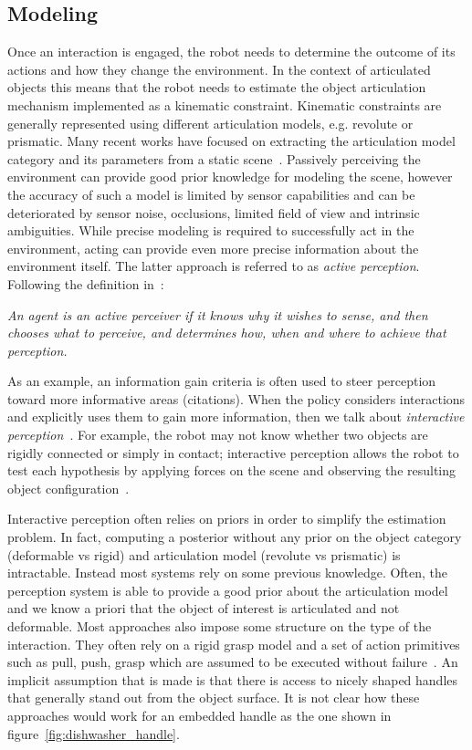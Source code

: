 \subsection{Modeling}
Once an interaction is engaged, the robot needs to determine the outcome of its actions and how they change the environment. In the context of articulated objects this means that the robot needs to estimate the object articulation mechanism implemented as a kinematic constraint. Kinematic constraints are generally represented using different articulation models, e.g. revolute or prismatic. Many recent works have focused on extracting the articulation model category and its parameters from a static scene~\cite{abbatematteo2019learning, li2020category}. 
Passively perceiving the environment can provide good prior knowledge for modeling the scene, however the accuracy of such a model is limited by sensor capabilities and can be deteriorated by sensor noise, occlusions, limited field of view and intrinsic ambiguities. While precise modeling is required to successfully act in the environment, acting can provide even more precise information about the environment itself. The latter approach is referred to as \emph{active perception}. Following the definition in~\cite{bajcsy2018revisiting}:
\begin{displayquote}
\emph{An agent is an active perceiver if it knows why it wishes to sense, and then chooses what to perceive, and determines how, when and where to achieve that perception.}
\end{displayquote}  
As an example, an information gain criteria is often used to steer perception toward more informative areas (citations). When the policy considers interactions and explicitly uses them to gain more information, then we talk about \emph{interactive perception}~\cite{bohg2017interactive, katz2014interactive}. For example, the robot may not know whether two objects are rigidly connected or simply in contact; interactive perception allows the robot to test each hypothesis by applying forces on the scene and observing the resulting object configuration~\citep{kroemer2019review}. 

Interactive perception often relies on priors in order to simplify the estimation problem. In fact, computing a posterior without any prior on the object category (deformable vs rigid) and articulation model (revolute vs prismatic) is intractable. Instead most systems rely on some previous knowledge. Often, the perception system is able to provide a good prior about the articulation model~\cite{katz2011interactive} and we know a priori that the object of interest is articulated and not deformable. Most approaches also impose some structure on the type of the interaction. They often rely on a rigid grasp model \cite{karayiannidis2013model} and a set of action primitives such as pull, push, grasp which are assumed to be executed without failure~\cite{hausman2015active}. An implicit assumption that is made is that there is access to nicely shaped handles that generally stand out from the object surface. It is not clear how these approaches would work for an embedded handle as the one shown in figure~\ref{fig:dishwasher_handle}.

